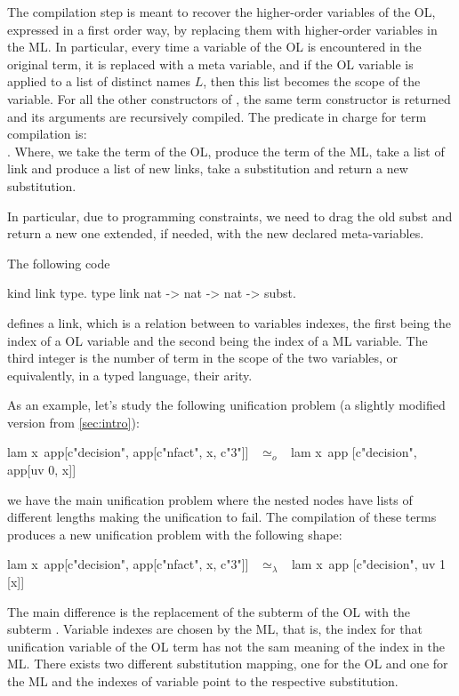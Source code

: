 \documentclass[sigconf,natbib=false]{acmart}
\newcommand{\UnifRel}{\ensuremath{\simeq}}
\newcommand{\Uo}{\ensuremath{\UnifRel_o}\xspace}
\newcommand{\Ue}{\ensuremath{\UnifRel_\lambda}\xspace}
\begin{document}
The compilation step is meant to recover the higher-order variables of the OL,
expressed in a first order way, by replacing them with higher-order variables in
the ML. In particular, every time a variable of the OL is encountered in the
original term, it is replaced with a meta variable, and if the OL variable is
applied to a list of distinct names $L$, then this list becomes the scope of the variable. 
For all the other constructors of
, the same term constructor is returned and its arguments are
recursively compiled. The predicate in charge for term compilation is:\\
.
Where, we take the term of the OL, produce the term of the ML, take a list
of link and produce a list of new links, take a substitution and return a 
new substitution.

In particular, due to programming constraints, we need to drag the old subst and
return a new one extended, if needed, with the new declared meta-variables.

The following code
%
\begin{elpicode}
  kind link type.
  type link nat -> nat -> nat -> subst.
\end{elpicode}
%
\noindent
defines a link, which is a relation between to variables indexes, the first
being the index of a OL variable and the second being the index of a ML
variable. The third integer is the number of term in the
scope of the two variables, or equivalently, in a typed language, their arity. 

As an example, let's study the following unification problem (a slightly 
modified version from \cref{sec:intro}):

\begin{elpicode}
  lam x\ app[c"decision", app[c"nfact", x, c"3"]] ~\Uo~
    lam x\ app [c"decision", app[uv 0, x]]
\end{elpicode}

\noindent
we have the main unification problem where the nested  nodes have
lists of different lengths making the unification to fail. The compilation of 
these terms produces a new unification problem with the following shape:

\begin{elpicode}
  lam x\ app[c"decision", app[c"nfact", x, c"3"]] ~\Ue~ 
    lam x\ app [c"decision", uv 1 [x]]
\end{elpicode}

\noindent
The main difference is the replacement of the subterm  of
the OL with the subterm . Variable indexes are chosen by the
ML, that is, the index  for that unification variable of the OL term
has not the sam meaning of the index  in the ML. There exists two
different substitution mapping, one for the OL and one for the ML and the indexes
of variable point to the respective substitution.
\end{document}
